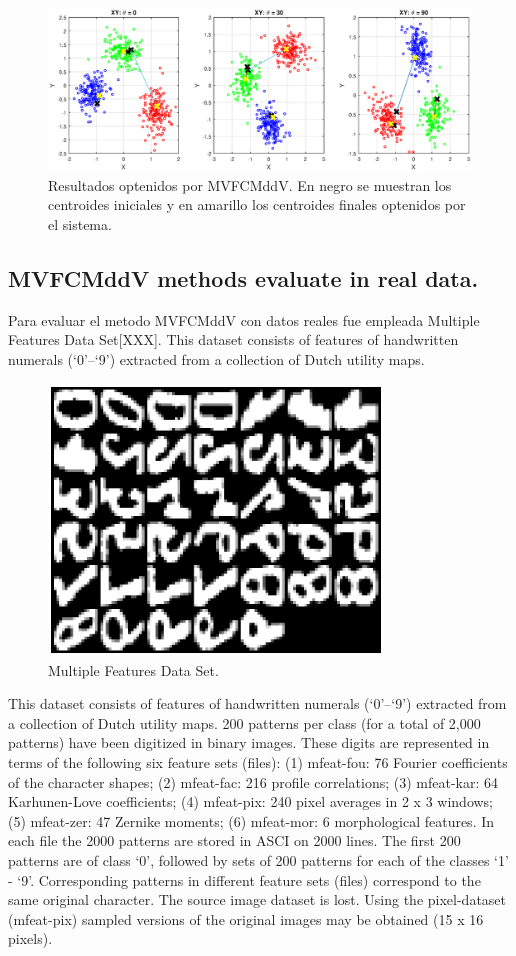 \documentclass[12pt]{article}
\begin{document}
\begin{figure}[h]
\centering
\includegraphics[width=4.5in]{../out/clusters-gauss-3.eps}
\caption{Resultados optenidos por MVFCMddV. En negro se muestran los centroides iniciales y en amarillo los centroides finales optenidos por el sistema.}
\label{fig:cluster_datos_sinteticos}
\end{figure}  


\subsection{MVFCMddV methods evaluate in real data.}

Para evaluar el metodo  MVFCMddV con datos reales fue empleada Multiple Features Data Set[XXX]. This dataset consists of features of handwritten numerals (`0'--`9') extracted from a collection of Dutch utility maps.

\begin{figure}[h]
\centering
\includegraphics[width=3.5in]{../out/data-base.eps}
\caption{Multiple Features Data Set.}
\label{fig:data_base}
\end{figure}  

This dataset consists of features of handwritten numerals (`0'--`9') extracted from a collection of Dutch utility maps. 200 patterns per class (for a total of 2,000 patterns) have been digitized in binary images. These digits are represented in terms of the following six feature sets (files): (1) mfeat-fou: 76 Fourier coefficients of the character shapes; (2) mfeat-fac: 216 profile correlations; (3) mfeat-kar: 64 Karhunen-Love coefficients; (4) mfeat-pix: 240 pixel averages in 2 x 3 windows; (5) mfeat-zer: 47 Zernike moments; (6) mfeat-mor: 6 morphological features. In each file the 2000 patterns are stored in ASCI on 2000 lines. The first 200 patterns are of class `0', followed by sets of 200 patterns for each of the classes `1' - `9'. Corresponding patterns in different feature sets (files) correspond to the same original character. The source image dataset is lost. Using the pixel-dataset (mfeat-pix) sampled versions of the original images may be obtained (15 x 16 pixels).
\end{document}
